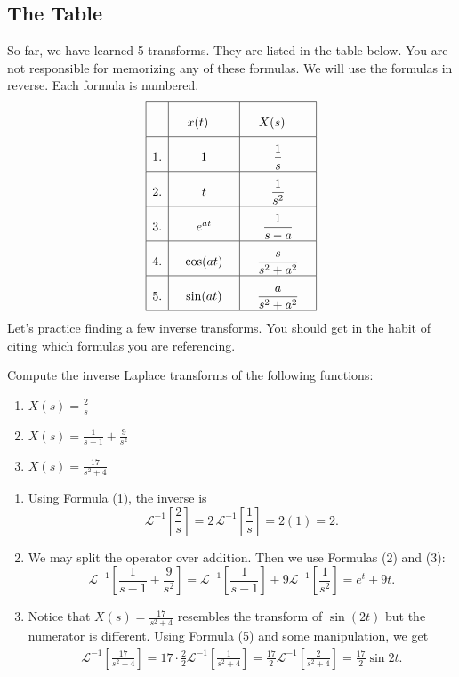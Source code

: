 \documentclass[10pt,letterpaper]{article}
\begin{document}
\subsection{The Table}
So far, we have learned 5 transforms. They are listed in the table below. You are not responsible for memorizing any of these formulas. We will use the formulas in reverse. Each formula is numbered. 
\[
\renewcommand{\arraystretch}{2.3}
\begin{array}{|c|c|c|}
\hline
 & \quad x(t)\qquad & \quad X(s) \qquad \\ 
\hline
1. & 1 & \dfrac{1}{s} \\ 
\hline
2. & t & \dfrac{1}{s^2} \\ 
\hline
3. & e^{at} & \dfrac{1}{s-a} \\ 
\hline
4. & \cos(at) & \dfrac{s}{s^2 + a^2} \\ 
\hline
5. & \sin(at) & \dfrac{a}{s^2 + a^2} \\ 
\hline
\end{array}
\]
Let's practice finding a few inverse transforms.
You should get in the habit of citing which formulas you are referencing.

\begin{example}[1]{
Compute the inverse Laplace transforms of the following functions:
\begin{enumerate}
    \item $X(s) = \frac{2}{s}$
    \item $X(s)=\frac{1}{s-1} + \frac{9}{s^2}$
    \item $X(s)=\frac{17}{s^2+4}$
\end{enumerate}
}
\begin{enumerate}
    \item Using Formula (1), the inverse is
$$
\mathcal{L}^{-1}\left[\frac{2}{s}\right] = 2\,\mathcal{L}^{-1}\left[\frac{1}{s}\right] = 2(1)=\boxed{2}.
$$
\item We may split the operator over addition. Then we use Formulas (2) and (3):
$$
\mathcal{L}^{-1}\left[\frac{1}{s-1} + \frac{9}{s^2}\right] = \mathcal{L}^{-1}\left[\frac{1}{s-1}\right] + 9\mathcal{L}^{-1}\left[\frac{1}{s^2}\right] = \boxed{e^{t}+9t}.
$$
\item Notice that $X(s)=\frac{17}{s^2+4}$ resembles the transform of $\sin(2t)$ but the numerator is different. Using Formula (5) and some manipulation, we get
\begin{align*}
\mathcal{L}^{-1}\left[\frac{17}{s^2+4} \right] = 17\cdot \frac{2}{2}\mathcal{L}^{-1}\left[\frac{1}{s^2+4}\right] =  \frac{17}{2}\mathcal{L}^{-1}\left[\frac{2}{s^2+4}\right] = \boxed{\frac{17}{2}\sin2t}.
\end{align*}
\end{enumerate}
\end{example}
\end{document}
